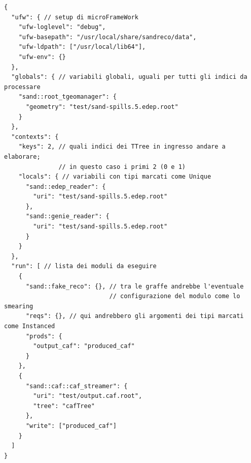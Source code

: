 \documentclass[../main.tex]{subfiles}
\begin{document}
\begin{listing}[ht]
  \caption{
    json di configurazione di un \textit{workflow} che utilizza
    fake-reco. N.B. il formato json non ammette commenti.
  }

  \label{lst:fake-reco}
  \begin{verbatim}
{
  "ufw": { // setup di microFrameWork
    "ufw-loglevel": "debug",
    "ufw-basepath": "/usr/local/share/sandreco/data",
    "ufw-ldpath": ["/usr/local/lib64"],
    "ufw-env": {}
  },
  "globals": { // variabili globali, uguali per tutti gli indici da processare
    "sand::root_tgeomanager": {
      "geometry": "test/sand-spills.5.edep.root"
    }
  },
  "contexts": {
    "keys": 2, // quali indici dei TTree in ingresso andare a elaborare;
               // in questo caso i primi 2 (0 e 1)
    "locals": { // variabili con tipi marcati come Unique
      "sand::edep_reader": {
        "uri": "test/sand-spills.5.edep.root"
      },
      "sand::genie_reader": {
        "uri": "test/sand-spills.5.edep.root"
      }
    }
  },
  "run": [ // lista dei moduli da eseguire
    {
      "sand::fake_reco": {}, // tra le graffe andrebbe l'eventuale
                             // configurazione del modulo come lo smearing
      "reqs": {}, // qui andrebbero gli argomenti dei tipi marcati come Instanced
      "prods": {
        "output_caf": "produced_caf"
      }
    },
    {
      "sand::caf::caf_streamer": {
        "uri": "test/output.caf.root",
        "tree": "cafTree"
      },
      "write": ["produced_caf"]
    }
  ]
}
  \end{verbatim}

\end{listing}
\end{document}
